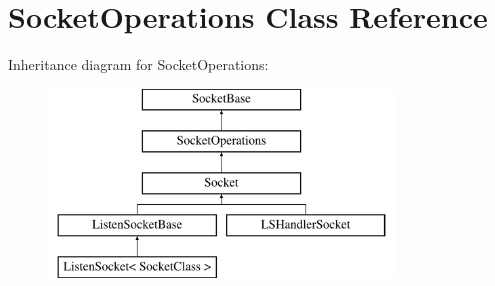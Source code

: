 \hypertarget{classSocketOperations}{
\section{SocketOperations Class Reference}
\label{classSocketOperations}
}
Inheritance diagram for SocketOperations:\begin{figure}[H]
\begin{center}
\leavevmode
\includegraphics[height=5.000000cm]{classSocketOperations}
\end{center}
\end{figure}
